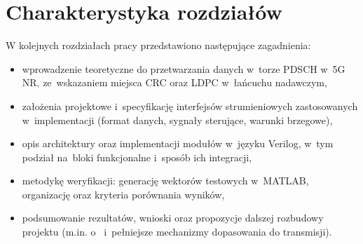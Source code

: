 \section{Charakterystyka rozdziałów}
\label{sec:wstep_rozdzialy}
W kolejnych rozdziałach pracy przedstawiono następujące zagadnienia:
\begin{itemize}
    \item wprowadzenie teoretyczne do przetwarzania danych w~torze PDSCH w~5G NR, ze~wskazaniem miejsca CRC oraz LDPC w~łańcuchu nadawczym,
    \item założenia projektowe i~specyfikację interfejsów strumieniowych zastosowanych w~implementacji (format danych, sygnały sterujące, warunki brzegowe),
    \item opis architektury oraz implementacji modułów w~języku Verilog, w~tym podział na~bloki funkcjonalne i~sposób ich integracji,
    \item metodykę weryfikacji: generację wektorów testowych w~MATLAB, organizację  oraz kryteria porównania wyników,
    \item podsumowanie rezultatów, wnioski oraz propozycje dalszej rozbudowy projektu (m.in. o~ i~pełniejsze mechanizmy dopasowania do transmisji).
\end{itemize}